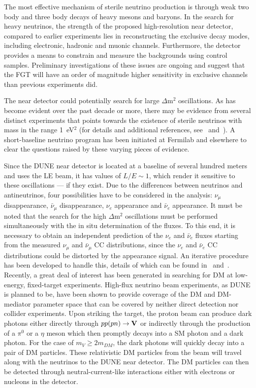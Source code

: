 The most effective mechanism of sterile neutrino production is through
weak two body and three body decays of heavy mesons and baryons. In
the search for heavy neutrinos, the strength of the proposed
high-resolution near detector, compared to earlier experiments lies in
reconstructing the exclusive decay modes, including electronic,
hadronic and muonic channels. Furthermore, the detector provides a
means to constrain and measure the backgrounds using control
samples. Preliminary investigations of these issues are ongoing and
suggest that the FGT will have an order of magnitude higher
sensitivity in exclusive channels than previous experiments did.


The near detector could potentially search for large $\Delta$m$^2$
oscillations. As has become evident over the past decade or more,
there may be evidence from several distinct experiments that points
towards the existence of sterile neutrinos with mass in the range
1~eV$^2$ (for details and additional references, see~\cite{DPR}
and~\cite{Adams:2013qkq}).  A short-baseline neutrino program has been
initiated at Fermilab and elsewhere to clear the questions raised by
these varying pieces of evidence.

Since the DUNE near detector is located at a baseline of several
hundred meters and uses the LE beam, it has values of $L/E \sim 1$,
which render it sensitive to these oscillations --- if they exist. Due
to the differences between neutrinos and antineutrinos, four
possibilities have to be considered in the analysis: $\nu_\mu$
disappearance, $\bar \nu_\mu$ disappearance, $\nu_e$ appearance and
$\bar \nu_e$ appearance.  It must be noted that the search for the
high $\Delta$m$^2$ oscillations must be performed simultaneously with
the in situ determination of the fluxes.  To this end, it is necessary
to obtain an independent prediction of the $\nu_e$ and $\bar \nu_e$
fluxes starting from the measured $\nu_\mu$ and $\bar \nu_\mu$ CC
distributions, since the $\nu_e$ and $\bar \nu_e$ CC distributions
could be distorted by the appearance signal.  An iterative procedure
has been developed to handle this, details of which
can be found in~\cite{DPR} and~\cite{Adams:2013qkq}.\\

Recently, a great deal of interest has been generated in searching for
DM at low-energy, fixed-target experiments.  High-flux neutrino beam
experiments, as DUNE is planned to be, have been shown to provide
coverage of the DM and DM-mediator parameter space that can be
covered by neither direct detection nor collider experiments. Upon
striking the target, the proton beam can produce dark photons either
directly through $pp(pn)\rightarrow \bf {V}$ or indirectly through the
production of a $\pi^{0}$ or a $\eta$ meson which then promptly decays
into a SM photon and a dark photon. For the case of $m_{V}\geq
2m_{DM}$, the dark photons will quickly decay into a pair of DM
particles.  These relativistic DM particles from the beam will travel
along with the neutrinos to the DUNE near detector.  The DM particles
can then be detected through neutral-current-like interactions either
with electrons or nucleons in the detector.

